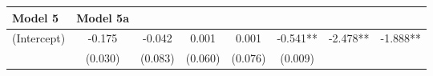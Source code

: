 \documentclass[12pt,twoside]{reedthesis}
\begin{document}
\begin{longtable}[]{@{}lccccccc@{}}
\begin{minipage}[b]{0.10\columnwidth}
  Model 5\strut
  \end{minipage} & \begin{minipage}[b]{0.10\columnwidth}\centering\strut
  Model 5a\strut
  \end{minipage}\tabularnewline
  \midrule
  \endhead
  \begin{minipage}[t]{0.12\columnwidth}\raggedright\strut
  (Intercept)\strut
  \end{minipage} & \begin{minipage}[t]{0.09\columnwidth}\centering\strut
  -0.175\strut
  \end{minipage} & \begin{minipage}[t]{0.10\columnwidth}\centering\strut
  -0.042\strut
  \end{minipage} & \begin{minipage}[t]{0.10\columnwidth}\centering\strut
  0.001\strut
  \end{minipage} & \begin{minipage}[t]{0.10\columnwidth}\centering\strut
  0.001\strut
  \end{minipage} & \begin{minipage}[t]{0.10\columnwidth}\centering\strut
  -0.541**\strut
  \end{minipage} & \begin{minipage}[t]{0.10\columnwidth}\centering\strut
  -2.478**\strut
  \end{minipage} & \begin{minipage}[t]{0.10\columnwidth}\centering\strut
  -1.888**\strut
  \end{minipage}\tabularnewline
  \begin{minipage}[t]{0.12\columnwidth}\raggedright\strut
  \strut
  \end{minipage} & \begin{minipage}[t]{0.09\columnwidth}\centering\strut
  (0.030)\strut
  \end{minipage} & \begin{minipage}[t]{0.10\columnwidth}\centering\strut
  (0.083)\strut
  \end{minipage} & \begin{minipage}[t]{0.10\columnwidth}\centering\strut
  (0.060)\strut
  \end{minipage} & \begin{minipage}[t]{0.10\columnwidth}\centering\strut
  (0.076)\strut
  \end{minipage} & \begin{minipage}[t]{0.10\columnwidth}\centering\strut
  (0.009)\strut

\end{minipage}
\end{longtable}
\end{document}
